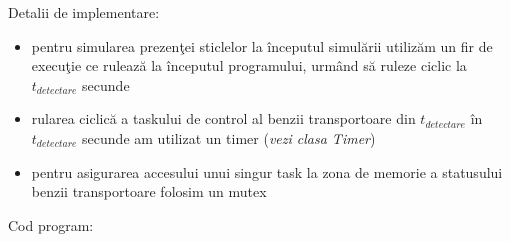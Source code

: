 \documentclass[a4paper, 11pt]{article}
\begin{document}
Detalii de implementare:

\begin{itemize}
\item pentru simularea prezen\c{t}ei sticlelor la \^{i}nceputul simul\u{a}rii utiliz\u{a}m un fir de execu\c{t}ie ce ruleaz\u{a} la \^{i}nceputul programului, urm\^{a}nd s\u{a} ruleze ciclic la $t_{detectare}$ secunde
\item rularea ciclic\u{a} a taskului de control al benzii transportoare din $t_{detectare}$ \^{i}n $t_{detectare}$ secunde am utilizat un timer (\textit{vezi clasa Timer}) 
\item pentru asigurarea accesului unui singur task la zona de memorie a statusului benzii transportoare folosim un mutex
\end{itemize}


Cod program:

\medskip
\medskip

\noindent
\end{document}
